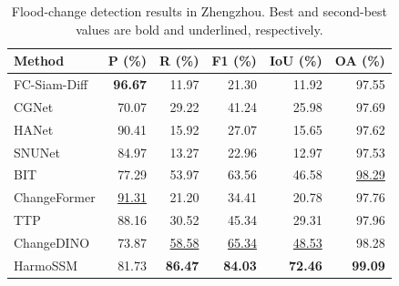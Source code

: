 \begingroup
\begin{table}[H]
\centering
\comparisonfont
\captionsetup{name=Table,font=comparisoncaption,labelfont=bf,labelsep=newline,justification=raggedright,singlelinecheck=false}
\caption{Flood-change detection results in Zhengzhou. Best and second-best values are bold and underlined, respectively.}
\label{tab:comparison_zhengzhou}
\fontsize{10}{12}\selectfont
\setlength{\tabcolsep}{6pt}
\renewcommand{\arraystretch}{1.15}
\begin{tabular*}{\linewidth}{@{\extracolsep{\fill}}lrrrrr@{}}
\toprule
Method & P (\%) & R (\%) & F1 (\%) & IoU (\%) & OA (\%) \\
\midrule
FC-Siam-Diff & \textbf{96.67} & 11.97 & 21.30 & 11.92 & 97.55 \\
CGNet & 70.07 & 29.22 & 41.24 & 25.98 & 97.69 \\
HANet & 90.41 & 15.92 & 27.07 & 15.65 & 97.62 \\
SNUNet & 84.97 & 13.27 & 22.96 & 12.97 & 97.53 \\
BIT & 77.29 & 53.97 & 63.56 & 46.58 & \underline{98.29} \\
ChangeFormer & \underline{91.31} & 21.20 & 34.41 & 20.78 & 97.76 \\
TTP & 88.16 & 30.52 & 45.34 & 29.31 & 97.96 \\
ChangeDINO & 73.87 & \underline{58.58} & \underline{65.34} & \underline{48.53} & 98.28 \\
HarmoSSM & 81.73 & \textbf{86.47} & \textbf{84.03} & \textbf{72.46} & \textbf{99.09} \\
\bottomrule
\end{tabular*}
\end{table}
\endgroup
